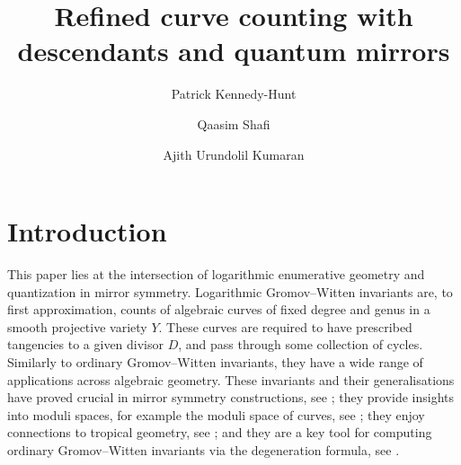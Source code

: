 \documentclass[11pt]{amsart}
\title{Refined curve counting with descendants and quantum mirrors}
\author{Patrick Kennedy-Hunt}
\author{Qaasim Shafi}
\author{Ajith Urundolil Kumaran}
\numberwithin{equation}{section}
\theoremstyle{plain}
\theoremstyle{remark}
\theoremstyle{definition}
\begin{document}


\maketitle


\begin{prelims}

\DisplayAbstractInEnglish

\bigskip

\DisplayKeyWords

\medskip

\DisplayMSCclass

\end{prelims}



\newpage

\setcounter{tocdepth}{1}

\tableofcontents





\section{Introduction}

This paper lies at the intersection of logarithmic enumerative geometry and quantization in mirror symmetry. Logarithmic Gromov--Witten invariants are, to first approximation, counts of algebraic curves of fixed degree and genus in a smooth projective variety $Y$. These curves are required to have prescribed tangencies to a given divisor $D$, and pass through some collection of cycles. Similarly to ordinary Gromov--Witten invariants, they have a wide range of applications across algebraic geometry. These invariants and their generalisations have proved crucial in mirror symmetry constructions, see \cite{gross2021intrinsic, gross2015mirror}; they provide insights into moduli spaces, for example the moduli space of curves, see \cite{graber2005relative,ranganathan2024logdr}; they enjoy connections to tropical geometry, see \cite{bousseau2018tropical,MandelRuddat,NishSieb06,graefnitz2022tropical}; and they are a key tool for computing ordinary Gromov--Witten invariants via the degeneration formula, see \cite{pandharipande2017gromov,okounkov2009gromov,maulik2006topological}.
\end{document}
